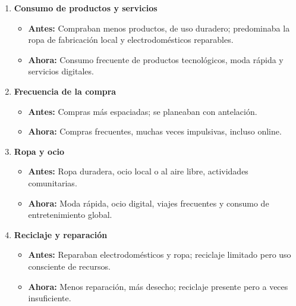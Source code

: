 


\begin{solution}
\begin{enumerate}
    \item \textbf{Consumo de productos y servicios}
    \begin{itemize}
        \item \textbf{Antes:} Compraban menos productos, de uso duradero; predominaba la ropa de fabricación local y electrodomésticos reparables.
        \item \textbf{Ahora:} Consumo frecuente de productos tecnológicos, moda rápida y servicios digitales.
    \end{itemize}

    \item \textbf{Frecuencia de la compra}
    \begin{itemize}
        \item \textbf{Antes:} Compras más espaciadas; se planeaban con antelación.
        \item \textbf{Ahora:} Compras frecuentes, muchas veces impulsivas, incluso online.
    \end{itemize}

    \item \textbf{Ropa y ocio}
    \begin{itemize}
        \item \textbf{Antes:} Ropa duradera, ocio local o al aire libre, actividades comunitarias.
        \item \textbf{Ahora:} Moda rápida, ocio digital, viajes frecuentes y consumo de entretenimiento global.
    \end{itemize}

    \item \textbf{Reciclaje y reparación}
    \begin{itemize}
        \item \textbf{Antes:} Reparaban electrodomésticos y ropa; reciclaje limitado pero uso consciente de recursos.
        \item \textbf{Ahora:} Menos reparación, más desecho; reciclaje presente pero a veces insuficiente.
    \end{itemize}


\end{enumerate}
\end{solution}

